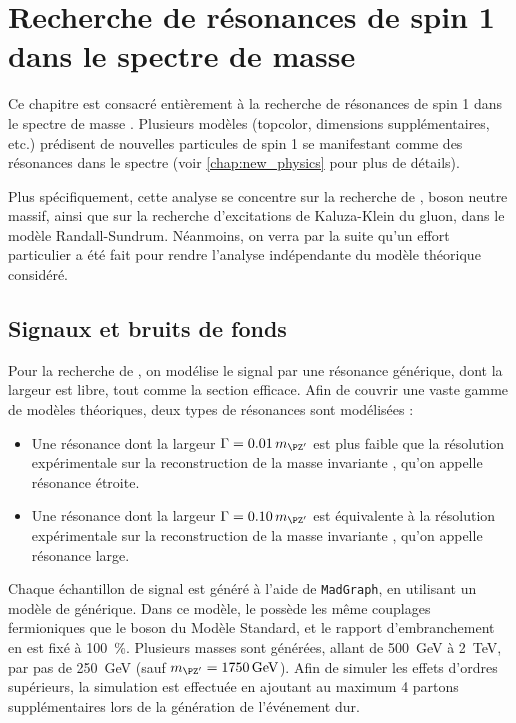 \chapter{Recherche de résonances de spin 1 dans le spectre de masse \ttbar} \label{chap:zprime}

Ce chapitre est consacré entièrement à la recherche de résonances de spin 1 dans le spectre de masse \ttbar. Plusieurs modèles (topcolor, dimensions supplémentaires, etc.) prédisent de nouvelles particules de spin 1 se manifestant comme des résonances dans le spectre \mtt (voir \cref{chap:new_physics} pour plus de détails).

\bigskip

Plus spécifiquement, cette analyse se concentre sur la recherche de \zprime, boson neutre massif, ainsi que sur la recherche d'excitations de Kaluza-Klein du gluon, dans le modèle Randall-Sundrum. Néanmoins, on verra par la suite qu'un effort particulier a été fait pour rendre l'analyse indépendante du modèle théorique considéré.

\section{Signaux et bruits de fonds}

Pour la recherche de \zprime, on modélise le signal par une résonance générique, dont la largeur est libre, tout comme la section efficace. Afin de couvrir une vaste gamme de modèles théoriques, deux types de résonances sont modélisées :
\begin{itemize}
    \item Une résonance dont la largeur $\Gamma = \num{0.01} \, \mzp$ est plus faible que la résolution expérimentale sur la reconstruction de la masse invariante \ttbar, qu'on appelle résonance étroite.
    \item Une résonance dont la largeur $\Gamma = \num{0.10} \, \mzp$ est équivalente à la résolution expérimentale sur la reconstruction de la masse invariante \ttbar, qu'on appelle résonance large.
\end{itemize}

Chaque échantillon de signal est généré à l'aide de \texttt{MadGraph}, en utilisant un modèle de \zprime générique. Dans ce modèle, le \zprime possède les même couplages fermioniques que le boson \PZ du Modèle Standard, et le rapport d'embranchement en \ttbar est fixé à \SI{100}{\%}. Plusieurs masses sont générées, allant de \SI{500}{\GeV} à \SI{2}{\TeV}, par pas de \SI{250}{\GeV} (sauf $\mzp = \SI{1750}{\GeV}$). Afin de simuler les effets d'ordres supérieurs, la simulation est effectuée en ajoutant au maximum 4 partons supplémentaires lors de la génération de l'événement dur.

